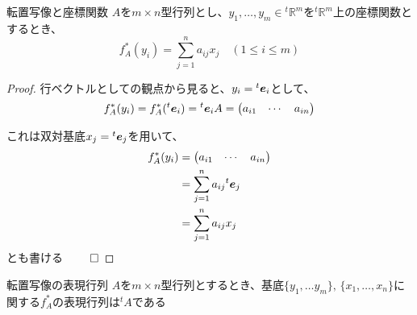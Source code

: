 \documentclass[../../../topic_linear-algebra]{subfiles}
\begin{document}
\br

\begin{theorem}{転置写像と座標関数}
  $A$を$m \times n$型行列とし、$y_1, \ldots, y_m \in {}^t\mathbb{R}^m$を${}^t\mathbb{R}^m$上の座標関数とするとき、
  \begin{equation*}
    f_A^*(y_i) = \sum_{j=1}^n a_{ij} x_j \quad (1 \leq i \leq m)
  \end{equation*}
\end{theorem}

\begin{proof}
  行ベクトルとしての観点から見ると、$y_i = {}^t\vb*{e}_i$として、
  \begin{equation*}
    f_A^*(y_i) = f_A^*({}^t\vb*{e}_i) = {}^t\vb*{e}_i A = \begin{pmatrix}
      a_{i1} & \cdots & a_{in}
    \end{pmatrix}
  \end{equation*}

  これは双対基底$x_j = {}^t\vb*{e}_j$を用いて、
  \begin{align*}
    f_A^*(y_i) & = \begin{pmatrix}
                     a_{i1} & \cdots & a_{in}
                   \end{pmatrix}          \\
               & = \sum_{j=1}^n a_{ij} {}^t\vb*{e}_j \\
               & = \sum_{j=1}^n a_{ij} x_j
  \end{align*}
  とも書ける $\qed$
\end{proof}

\br

\begin{theorem}{転置写像の表現行列}
  $A$を$m \times n$型行列とするとき、基底$\{y_1,\ldots y_m\},\,\{x_1,\ldots,x_n\}$に関する$f_A^*$の表現行列は${}^tA$である
\end{theorem}
\end{document}
